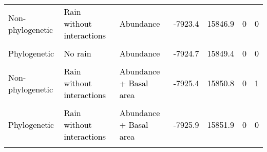 \documentclass[
  12pt,
  letterpaper,
  DIV=11,
  numbers=noendperiod]{scrartcl}
\begin{document}
\begin{table}[H]
{\begin{tabular}[t]{lllllll}
\textcolor{black}{Non-phylogenetic} & \textcolor{black}{Rain without interactions} & \textcolor{black}{Abundance} & \textcolor{black}{-7923.4} & \textcolor{black}{15846.9} & \textcolor{black}{0} & \textcolor{black}{0}\\
\cellcolor{gray!6}{\textcolor{black}{Non-phylogenetic}} & \cellcolor{gray!6}{\textcolor{black}{No rain}} & \cellcolor{gray!6}{\textcolor{black}{Abundance}} & \cellcolor{gray!6}{\textcolor{black}{-7924.2}} & \cellcolor{gray!6}{\textcolor{black}{15848.4}} & \cellcolor{gray!6}{\textcolor{black}{0}} & \cellcolor{gray!6}{\textcolor{black}{1}}\\
\textcolor{black}{Phylogenetic} & \textcolor{black}{No rain} & \textcolor{black}{Abundance} & \textcolor{black}{-7924.7} & \textcolor{black}{15849.4} & \textcolor{black}{0} & \textcolor{black}{0}\\
\addlinespace
\cellcolor{gray!6}{\textcolor{gray}{Non-phylogenetic}} & \cellcolor{gray!6}{\textcolor{gray}{No rain}} & \cellcolor{gray!6}{\textcolor{gray}{Basal area}} & \cellcolor{gray!6}{\textcolor{gray}{-7924.8}} & \cellcolor{gray!6}{\textcolor{gray}{15849.7}} & \cellcolor{gray!6}{\textcolor{gray}{0}} & \cellcolor{gray!6}{\textcolor{gray}{4}}\\
\textcolor{black}{Non-phylogenetic} & \textcolor{black}{Rain without interactions} & \textcolor{black}{Abundance + Basal area} & \textcolor{black}{-7925.4} & \textcolor{black}{15850.8} & \textcolor{black}{0} & \textcolor{black}{1}\\
\cellcolor{gray!6}{\textcolor{black}{Phylogenetic}} & \cellcolor{gray!6}{\textcolor{black}{No rain}} & \cellcolor{gray!6}{\textcolor{black}{Basal area}} & \cellcolor{gray!6}{\textcolor{black}{-7925.5}} & \cellcolor{gray!6}{\textcolor{black}{15851.1}} & \cellcolor{gray!6}{\textcolor{black}{0}} & \cellcolor{gray!6}{\textcolor{black}{1}}\\
\textcolor{black}{Phylogenetic} & \textcolor{black}{Rain without interactions} & \textcolor{black}{Abundance + Basal area} & \textcolor{black}{-7925.9} & \textcolor{black}{15851.9} & \textcolor{black}{0} & \textcolor{black}{0}\\
\cellcolor{gray!6}{\textcolor{black}{Phylogenetic}} & \cellcolor{gray!6}{\textcolor{black}{Rain without interactions}} & \cellcolor{gray!6}{\textcolor{black}{Abundance \$\textbackslash{}times\$ Basal area}} & \cellcolor{gray!6}{\textcolor{black}{-7926.3}} & \cellcolor{gray!6}{\textcolor{black}{15852.5}} & \cellcolor{gray!6}{\textcolor{black}{0}} & \cellcolor{gray!6}{\textcolor{black}{0}}\\

\end{tabular}}
\end{table}
\end{document}
